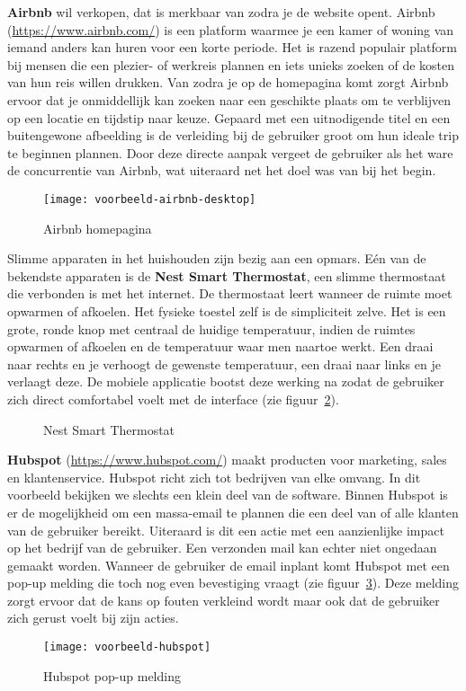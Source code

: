 \textbf{Airbnb} wil verkopen, dat is merkbaar van zodra je de website opent. Airbnb (\url{https://www.airbnb.com/}) is een platform waarmee je een kamer of woning van iemand anders kan huren voor een korte periode. Het is razend populair platform bij mensen die een plezier- of werkreis plannen en iets unieks zoeken of de kosten van hun reis willen drukken. Van zodra je op de homepagina komt zorgt Airbnb ervoor dat je onmiddellijk kan zoeken naar een geschikte plaats om te verblijven op een locatie en tijdstip naar keuze. Gepaard met een uitnodigende titel en een buitengewone afbeelding is de verleiding bij de gebruiker groot om hun ideale trip te beginnen plannen. Door deze directe aanpak vergeet de gebruiker als het ware de concurrentie van Airbnb, wat uiteraard net het doel was van bij het begin.

\begin{figure}
    \centering
    \texttt{[image: voorbeeld-airbnb-desktop]}
    \caption{Airbnb homepagina}
    \label{fig:ux-voorbeeld-airbnb}
\end{figure}

Slimme apparaten in het huishouden zijn bezig aan een opmars. Eén van de bekendste apparaten is de \textbf{Nest Smart Thermostat}, een slimme thermostaat die verbonden is met het internet. De thermostaat leert wanneer de ruimte moet opwarmen of afkoelen. Het fysieke toestel zelf is de simpliciteit zelve. Het is een grote, ronde knop met centraal de huidige temperatuur, indien de ruimtes opwarmen of afkoelen en de temperatuur waar men naartoe werkt. Een draai naar rechts en je verhoogt de gewenste temperatuur, een draai naar links en je verlaagt deze. De mobiele applicatie bootst deze werking na zodat de gebruiker zich direct comfortabel voelt met de interface (zie figuur~\ref{fig:ux-voorbeeld-nest}).

\begin{figure}
    \centering
    \qquad
    \caption{Nest Smart Thermostat}
    \label{fig:ux-voorbeeld-nest}
\end{figure}

\textbf{Hubspot} (\url{https://www.hubspot.com/}) maakt producten voor marketing, sales en klantenservice. Hubspot richt zich tot bedrijven van elke omvang. In dit voorbeeld bekijken we slechts een klein deel van de software. Binnen Hubspot is er de mogelijkheid om een massa-email te plannen die een deel van of alle klanten van de gebruiker bereikt. Uiteraard is dit een actie met een aanzienlijke impact op het bedrijf van de gebruiker. Een verzonden mail kan echter niet ongedaan gemaakt worden. Wanneer de gebruiker de email inplant komt Hubspot met een pop-up melding die toch nog even bevestiging vraagt (zie figuur~\ref{fig:ux-voorbeeld-hubspot}). Deze melding zorgt ervoor dat de kans op fouten verkleind wordt maar ook dat de gebruiker zich gerust voelt bij zijn acties.

\begin{figure}
    \centering
    \texttt{[image: voorbeeld-hubspot]}
    \caption{Hubspot pop-up melding}
    \label{fig:ux-voorbeeld-hubspot}
\end{figure}


